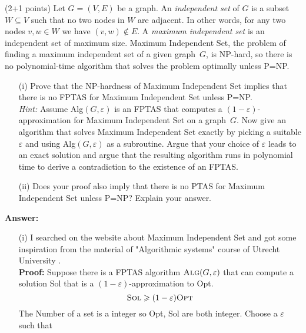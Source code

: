 \documentclass{article}
\newcommand{\eps}{\varepsilon}
\renewcommand{\geq}{\geqslant}
\newcounter{rcounter}
\newenvironment{rlist}%
{\begin{list}{\setnr-\arabic{rcounter}}{\usecounter{rcounter}}}{\end{list}}
\begin{document}
\begin{rlist}
\begin{enumerate}
        \end{enumerate}
        
        \item (2+1 points)
        Let $G=(V,E)$ be a graph. An \emph{independent set} of $G$ is a subset $W\subseteq V$
        such that no two nodes in $W$ are adjacent. In other words, for any two nodes $v,w\in W$ we
        have $(v,w)\not\in E$. A \emph{maximum independent set} is an independent set of maximum size.
        {\sc Maximum Independent Set}, the problem of finding a maximum independent set of a
        given graph~$G$, is NP-hard, so there is no polynomial-time algorithm that solves the
        problem optimally unless P=NP.
        \begin{enumerate}
            \item[(i)]
            Prove that the NP-hardness of {\sc Maximum Independent Set} implies that there is 
            no FPTAS for {\sc Maximum Independent Set} unless P=NP.
            \\[2mm]
            \emph{Hint:} Assume {\sc Alg}$(G,\eps)$ is an FPTAS that computes a $(1-\eps)$-approximation
            for {\sc Maximum Independent Set} on a graph~$G$. Now give an algorithm that solves
            {\sc Maximum Independent Set} exactly by picking a suitable $\eps$ and using
            {\sc Alg}$(G,\eps)$ as a subroutine. Argue that your choice of $\eps$ leads to
            an exact solution and argue that the resulting algorithm runs in polynomial time
            to derive a contradiction to the existence of an FPTAS.
            \item[(ii)]
            Does your proof also imply that there is no PTAS for {\sc Maximum Independent Set} unless P=NP? Explain your answer.
        \end{enumerate}
        \textbf{Answer:}
        \begin{enumerate}
            \item[(i)] I searched on the website about {\sc Maximum Independent Set} and got some inspiration from the material of
            "Algorithmic systems" course of Utrecht University \cite{uuAAcourse}.\\
            \textbf{Proof:} Suppose there is a FPTAS algorithm $\textrm{\sc Alg}(G, \varepsilon)$ that can compute a solution
            {\sc Sol} that is a $(1-\eps)$-approximation to {\sc Opt}.
            $$\textrm{\sc Sol} \geq (1-\eps)\textrm{\sc Opt}$$
            The Number of a set is a integer so {\sc Opt, Sol} are both integer. Choose a $\eps$ such that 

\end{enumerate}
\end{rlist}
\end{document}
